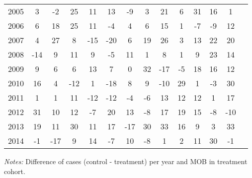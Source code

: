 \begin{table}[H]
\begin{threeparttable}
{\begin{tabular}{l*{13}{c}}
2005        &           3&          -2&          25&          11&          13&          -9&           3&          21&           6&          31&          16&           1\\
2006        &           6&          18&          25&          11&          -4&           4&           6&          15&           1&          -7&          -9&          12\\
2007        &           4&          27&           8&         -15&         -20&           6&          19&          26&           3&          13&          22&          20\\
2008        &         -14&           9&          11&           9&          -5&          11&           1&           8&           1&           9&          23&          14\\
2009        &           9&           6&           6&          13&           7&           0&          32&         -17&          -5&          18&          16&          12\\
2010        &          16&           4&         -12&           1&         -18&           8&           9&         -10&          29&           1&          -3&          30\\
2011        &           1&           1&          11&         -12&         -12&          -4&          -6&          13&          12&          12&           1&          17\\
2012        &          31&          10&          12&          -7&          20&          13&          -8&          17&          19&          15&          -8&         -10\\
2013        &          19&          11&          30&          11&          17&         -17&          30&          33&          16&           9&           3&          33\\
2014        &          -1&         -17&           9&          14&          -7&          10&          -8&           1&           2&          11&          30&          -1\\
 \bottomrule \end{tabular} } \begin{tablenotes} \item \scriptsize \emph{Notes:} Difference of cases (control - treatment) per year and MOB in treatment cohort. \end{tablenotes} \end{threeparttable} \end{table} 
